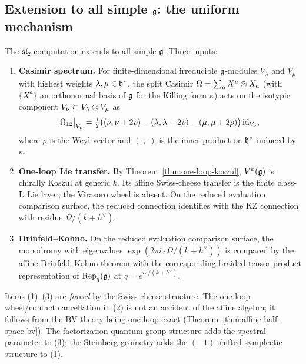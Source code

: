 \subsection{Extension to all simple $\mathfrak{g}$: the uniform mechanism}
\label{subsec:uniform-mechanism}

The $\mathfrak{sl}_2$ computation extends to all simple $\mathfrak{g}$. Three
inputs:

\begin{enumerate}[label=\textup{(\arabic*)}]
\item \textbf{Casimir spectrum.} For finite-dimensional irreducible $\mathfrak{g}$-modules $V_\lambda$ and $V_\mu$ with highest weights $\lambda, \mu \in \mathfrak{h}^*$, the split Casimir $\Omega = \sum_a X^a \otimes X_a$ (with $\{X^a\}$ an orthonormal basis of $\mathfrak{g}$ for the Killing form $\kappa$) acts on the isotypic component $V_\nu \subset V_\lambda \otimes V_\mu$ as
\[
 \Omega_{12}\big|_{V_\nu} = \tfrac{1}{2}\bigl((\nu, \nu + 2\rho) - (\lambda, \lambda + 2\rho) - (\mu, \mu + 2\rho)\bigr)\,\mathrm{id}_{V_\nu},
\]
where $\rho$ is the Weyl vector and $(\cdot, \cdot)$ is the inner product on $\mathfrak{h}^*$ induced by $\kappa$.

\item \textbf{One-loop Lie transfer.} By Theorem~\ref{thm:one-loop-koszul}, $V^k(\mathfrak{g})$ is chirally Koszul at generic $k$. Its affine Swiss-cheese transfer is the finite class-$\mathbf{L}$ Lie layer; the Virasoro wheel is absent. On the reduced evaluation comparison surface, the reduced connection identifies with the KZ connection with residue $\Omega/(k + h^\vee)$.

\item \textbf{Drinfeld--Kohno.} On the reduced evaluation comparison
surface, the monodromy with eigenvalues
$\exp(2\pi i \cdot \Omega/(k + h^\vee))$ is compared by the affine
Drinfeld--Kohno theorem with the corresponding braided tensor-product
representation of $\mathrm{Rep}_q(\mathfrak{g})$ at
$q = e^{i\pi/(k+h^\vee)}$.
\end{enumerate}

Items (1)--(3) are \emph{forced} by the Swiss-cheese structure. The
one-loop wheel/contact cancellation in (2) is not an accident of the
affine algebra; it follows from the BV theory being one-loop exact
(Theorem~\ref{thm:affine-half-space-bv}). The factorization quantum
group structure adds the spectral parameter to (3); the Steinberg
geometry adds the $(-1)$-shifted symplectic structure to (1).


